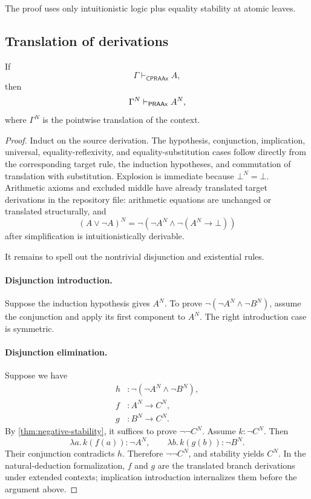 The proof uses only intuitionistic logic plus equality stability at atomic leaves.

\subsection{Translation of derivations}

\begin{theorem}
\label{thm:proof-translation}
If
\[
  \Gamma\vdash_{\mathsf{CPRAAx}} A,
\]
then
\[
  \Gamma^N\vdash_{\mathsf{PRAAx}} A^N,
\]
where \(\Gamma^N\) is the pointwise translation of the context.
\end{theorem}

\begin{proof}
Induct on the source derivation.  The hypothesis, conjunction, implication, universal, equality-reflexivity, and equality-substitution cases follow directly from the corresponding target rule, the induction hypotheses, and commutation of translation with substitution.  Explosion is immediate because \(\bot^N=\bot\).  Arithmetic axioms and excluded middle have already translated target derivations in the repository file: arithmetic equations are unchanged or translated structurally, and
\[
 (A\vee\neg A)^N
 =\neg(\neg A^N\wedge\neg(A^N\to\bot))
\]
after simplification is intuitionistically derivable.

It remains to spell out the nontrivial disjunction and existential rules.

\paragraph{Disjunction introduction.}
Suppose the induction hypothesis gives \(A^N\).  To prove
\(\neg(\neg A^N\wedge\neg B^N)\), assume the conjunction and apply its first component to \(A^N\).  The right introduction case is symmetric.

\paragraph{Disjunction elimination.}
Suppose we have
\begin{align*}
 h&:\neg(\neg A^N\wedge\neg B^N),\\
 f&:A^N\to C^N,\\
 g&:B^N\to C^N.
\end{align*}
By \cref{thm:negative-stability}, it suffices to prove \(\neg\neg C^N\).  Assume \(k:\neg C^N\).  Then
\[
  \lambda a.\,k(f(a)):\neg A^N,
  \qquad
  \lambda b.\,k(g(b)):\neg B^N.
\]
Their conjunction contradicts \(h\).  Therefore \(\neg\neg C^N\), and stability yields \(C^N\).  In the natural-deduction formalization, \(f\) and \(g\) are the translated branch derivations under extended contexts; implication introduction internalizes them before the argument above.


\end{proof}
